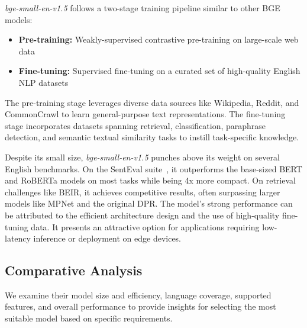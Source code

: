 \textit{\textit{bge-small-en-v1.5}} follows a two-stage training pipeline similar to other BGE models:
\begin{itemize}
    \item \textbf{Pre-training:} Weakly-supervised contrastive pre-training on large-scale web data
    \item \textbf{Fine-tuning:} Supervised fine-tuning on a curated set of high-quality English NLP datasets
\end{itemize}

The pre-training stage leverages diverse data sources like Wikipedia, Reddit, and CommonCrawl to learn general-purpose text representations. The fine-tuning stage incorporates datasets spanning retrieval, classification, paraphrase detection, and semantic textual similarity tasks to instill task-specific knowledge.

Despite its small size, \textit{\textit{bge-small-en-v1.5}} punches above its weight on several English benchmarks.
On the SentEval suite~\cite{conneau2018senteval}, it outperforms the base-sized BERT and RoBERTa models on most tasks while being 4x more compact.
On retrieval challenges like BEIR, it achieves competitive results, often surpassing larger models like MPNet and the original DPR.
The model's strong performance can be attributed to the efficient architecture design and the use of high-quality fine-tuning data.
It presents an attractive option for applications requiring low-latency inference or deployment on edge devices.

\subsection{Comparative Analysis}\label{subsec:comparative-analysis}
We examine their model size and efficiency, language coverage, supported features, and overall performance to provide insights for selecting the most suitable model based on specific requirements.

